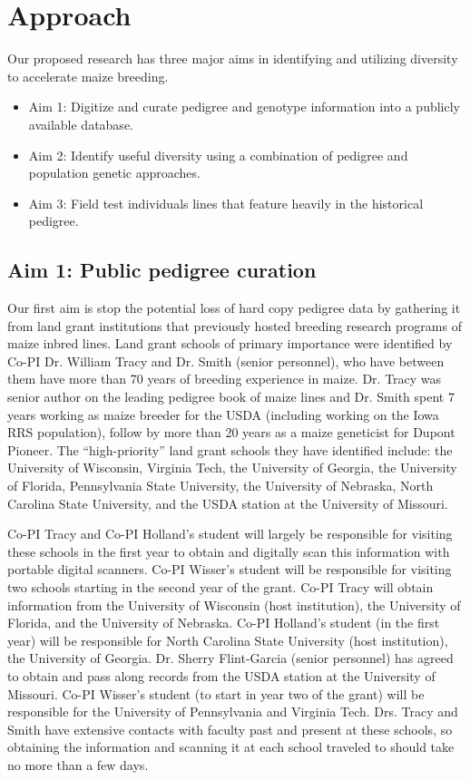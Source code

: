 \documentclass[12pt]{article}
\begin{document}
\section*{Approach}
\label{sec:approach}
Our proposed research has three major aims in identifying and utilizing diversity to accelerate maize breeding.

\begin{itemize}
\item Aim 1: Digitize and curate pedigree and genotype information into a publicly available database. 
\item Aim 2: Identify useful diversity using a combination of pedigree and population genetic approaches.
\item Aim 3: Field test individuals lines that feature heavily in the historical pedigree.
\end{itemize}

\subsection*{Aim 1: Public pedigree curation}
Our first aim is stop the potential loss of hard copy pedigree data by gathering it from land grant institutions that previously hosted breeding research programs of maize inbred lines. 
Land grant schools of primary importance were identified by Co-PI Dr. William Tracy and  Dr. Smith (senior personnel), who have between them have more than 70 years of breeding experience in maize. 
Dr. Tracy was senior author on the leading pedigree book of maize lines \cite{gerdes1993compilation} and Dr. Smith spent 7 years working as maize breeder for the USDA (including working on the Iowa RRS population), follow by more than 20 years as a maize geneticist for Dupont Pioneer. The ``high-priority'' land grant schools they have identified include: the University of Wisconsin, Virginia Tech, the University of Georgia, the University of Florida, Pennsylvania State University, the University of Nebraska, North Carolina State University, and the USDA station at the University of Missouri. 

Co-PI Tracy and Co-PI Holland's student will largely be responsible for visiting these schools in the first year to obtain and digitally scan this information with portable digital scanners. 
Co-PI Wisser's student will be responsible for visiting two schools starting in the second year of the grant.
Co-PI  Tracy will obtain information from the University of Wisconsin (host institution), the University of Florida, and the University of Nebraska. 
Co-PI Holland's student (in the first year) will be responsible for North Carolina State University (host institution), the University of Georgia.
Dr. Sherry Flint-Garcia (senior personnel) has agreed to obtain and pass along records from the USDA station at the University of Missouri. 
Co-PI Wisser's student (to start in year two of the grant) will be responsible for the University of Pennsylvania and Virginia Tech.
Drs. Tracy and Smith have extensive contacts with faculty past and present at these schools, so obtaining the information and scanning it at each school traveled to should take no more than a few days. 
\end{document}
